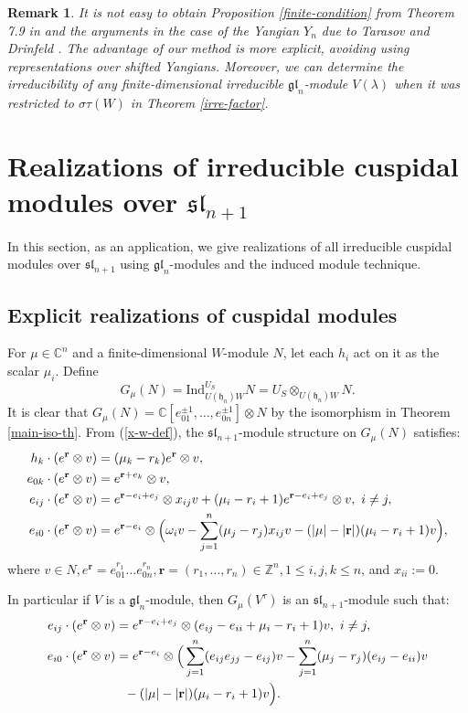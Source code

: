 \documentclass[12pt,a4paper]{amsart}
\newtheorem{remark}[theorem]{Remark}%
\numberwithin{equation}{section}
\newcommand{\C}{\mathbb C}
\newcommand{\Z}{\mathbb{Z}}
\def\mh{\mathfrak{h}}
\def\sl{\mathfrak{sl}}
\def\gl{\mathfrak{gl}}
\def\br{\mathbf{r}}
\def\l{\lambda}
\begin{document}
\begin{remark} It is not easy to  obtain Proposition  \ref{finite-condition} from
Theorem 7.9 in \cite{BK2} and the arguments in the case of the Yangian $Y_n$ due to Tarasov \cite{Ta} and Drinfeld \cite{Dr}. The advantage of our method is more explicit,  avoiding using
representations over shifted Yangians. Moreover, we can determine the irreducibility  of  any finite-dimensional irreducible $\gl_n$-module $V(\l)$  when it was restricted to   $\sigma\tau(W)$ in Theorem \ref{irre-factor}.
\end{remark}

\section{Realizations of  irreducible cuspidal modules over $\sl_{n+1}$}\label{Sec.4}

In this section, as an application, we give  realizations of
all irreducible cuspidal modules over $\sl_{n+1}$ using
$\gl_n$-modules and the induced module technique.

\subsection{Explicit realizations of cuspidal modules}

For  $\mu\in \C^n$ and a finite-dimensional $W$-module $N$, let each $h_{i}$
 act  on it as the scalar $\mu_i$.
  Define
  $$G_\mu(N)=\text{Ind}_{U(\mh_n)W}^{U_S}N=U_{S}\otimes_{U(\mh_n)W} N.$$ It is clear that $G_\mu(N)=\C[e_{01}^{\pm 1},\dots, e_{0n}^{\pm 1}]\otimes N$ by the isomorphism in Theorem \ref{main-iso-th}.
  From  (\ref{x-w-def}),
   the $\sl_{n+1}$-module structure on $G_\mu(N)$ satisfies:
  $$\aligned h_k \cdot (e^{\br}\otimes v)& =(\mu_k-r_k)e^{\br}\otimes v,\\
  e_{0k} \cdot (e^{\br}\otimes v)& =e^{\br+e_k}\otimes v,\\
   e_{ij}\cdot  (e^{\br}\otimes v)& =e^{\br-e_i+e_j}\otimes x_{ij} v+(\mu_i-r_i+1)e^{\br-e_i+e_j}\otimes v,\ i\neq j,\\
  e_{i0}\cdot (e^{\br}\otimes v)
  &= e^{\br-e_i}\otimes\Big( \omega_i v-\sum_{j=1}^n(\mu_j-r_j) x_{ij}v- (|\mu|-|\br|)(\mu_i-r_i+1) v\Big),
  \endaligned$$
where $v\in N, e^{\br}=e_{01}^{r_1}\dots e_{0n}^{r_n}, \br=(r_1,\dots, r_n)\in \Z^n, 1\leq i, j, k\leq n$, and $x_{ii}:=0$.


In particular if $V$ is a $\gl_n$-module, then
$G_\mu(V^\tau)$ is an $\sl_{n+1}$-module such that:
\begin{equation}\label{ind-mod}\aligned
   e_{ij}\cdot  (e^{\br}\otimes v)& =e^{\br-e_i+e_j}\otimes(e_{ij}-e_{ii}+\mu_i-r_i+1)v,\ i\neq j,\\
  e_{i0}\cdot (e^{\br}\otimes v)
  &= e^{\br-e_i}\otimes\Big( \sum_{j=1}^n (e_{ij}e_{jj}-e_{ij}) v-\sum_{j=1}^n(\mu_j-r_j) (e_{ij}-e_{ii})v\\
   & \ \ - (|\mu|-|\br|)(\mu_i-r_i+1) v\Big).
  \endaligned\end{equation}
\end{document}
